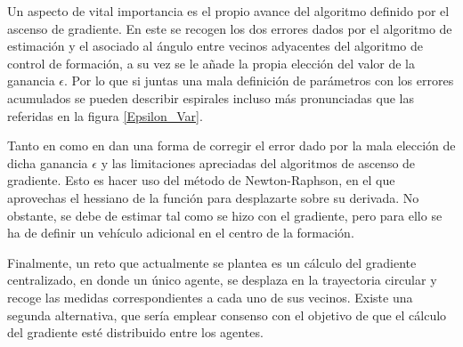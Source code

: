 Un aspecto de vital importancia es el propio avance del algoritmo definido por el ascenso de gradiente. En este se recogen los dos errores dados por el algoritmo de estimación y el asociado al ángulo entre vecinos adyacentes del algoritmo de control de formación, a su vez se le añade la propia elección del valor de la ganancia $\epsilon$. Por lo que si juntas una mala definición de parámetros con los errores acumulados se pueden describir espirales incluso más pronunciadas que las referidas en la figura \ref{Epsilon_Var}.

Tanto en \cite{Estimacion_Gradiente} como en \cite{Adicional_Estimacion_1} dan una forma de corregir el error dado por la mala elección de dicha ganancia $\epsilon$ y las limitaciones apreciadas del algoritmos de ascenso de gradiente. Esto es hacer uso del método de Newton-Raphson, en el que aprovechas el hessiano de la función para desplazarte sobre su derivada. No obstante, se debe de estimar tal como se hizo con el gradiente, pero para ello se ha de definir un vehículo adicional en el centro de la formación.

Finalmente, un reto que actualmente se plantea es un cálculo del gradiente centralizado, en donde un único agente, se desplaza en la trayectoria circular y recoge las medidas correspondientes a cada uno de sus vecinos. Existe una segunda alternativa, que sería emplear consenso con el objetivo de que el cálculo del gradiente esté distribuido entre los agentes.

\nocite{Git__todos}